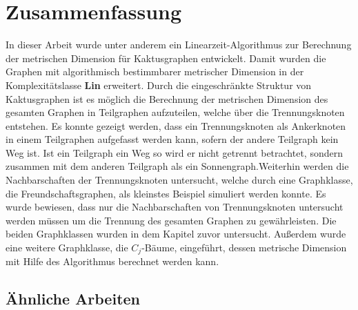\chapter{Zusammenfassung}
\vspace{-5mm}
In dieser Arbeit wurde unter anderem ein Linearzeit-Algorithmus zur Berechnung der metrischen Dimension für Kaktusgraphen entwickelt. Damit wurden die Graphen mit algorithmisch bestimmbarer metrischer Dimension in der Komplexitätslasse \textbf{Lin} erweitert.\vspace{-1.5mm}\newline\newline
Durch die eingeschränkte Struktur von Kaktusgraphen ist es möglich die Berechnung der metrischen Dimension des gesamten Graphen in Teilgraphen aufzuteilen, welche über die Trennungsknoten entstehen. Es konnte gezeigt werden, dass ein Trennungsknoten als Ankerknoten in einem Teilgraphen aufgefasst werden kann, sofern der andere Teilgraph kein Weg ist. Ist ein Teilgraph ein Weg so wird er nicht getrennt betrachtet, sondern zusammen mit dem anderen Teilgraph als ein Sonnengraph.\newline Weiterhin werden die Nachbarschaften der Trennungsknoten untersucht, welche durch eine Graphklasse, die Freundschaftsgraphen, als kleinstes Beispiel simuliert werden konnte. Es wurde bewiesen, dass nur die Nachbarschaften von Trennungsknoten untersucht werden müssen um die Trennung des gesamten Graphen zu gewährleisten. \vspace{-1.5mm}\newline\newline
Die beiden Graphklassen wurden in dem Kapitel zuvor untersucht. Außerdem wurde eine weitere Graphklasse, die $C_j$-Bäume, eingeführt, dessen metrische Dimension mit Hilfe des Algorithmus berechnet werden kann.
\vspace{-5mm}
\section{Ähnliche Arbeiten}
\vspace{-3mm}
